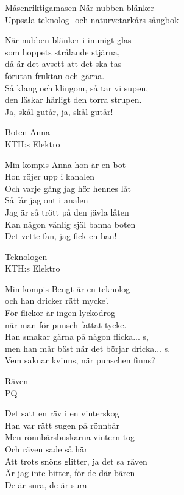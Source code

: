 \begin{song}{Måsen}{riktigamasen}
\newpage
  {\Large När nubben blänker}\\{\tiny  Uppsala teknolog- och naturvetarkårs sångbok}
  \begin{vers}
När nubben blänker i immigt glas \\
som hoppets strålande stjärna, \\
då är det avsett att det ska tas \\
förutan fruktan och gärna. \\
Så klang och klingom, så tar vi supen, \\
den läskar härligt den torra strupen. \\
Ja, skål gutår, ja, skål gutår! \\
\end{vers}
 

  {\Large Boten Anna}\\{\tiny  KTH:s Elektro}
  \begin{vers}
Min kompis Anna hon är en bot \\
Hon röjer upp i kanalen \\
Och varje gång jag hör hennes låt \\
Så får jag ont i analen\\ 
Jag är så trött på den jävla låten \\
Kan någon vänlig själ banna boten \\
Det vette fan, jag fick en ban! \\
\end{vers}


  {\Large Teknologen}\\{\tiny  KTH:s Elektro}
  \begin{vers}
Min kompis Bengt är en teknolog \\
och han dricker rätt mycke’. \\
För flickor är ingen lyckodrog \\
när man för punsch fattat tycke. \\
Han smakar gärna på någon flicka... s, \\
men han mår bäst när det börjar dricka... s. \\
Vem saknar kvinns, när punschen finns? \\
\end{vers}
 

  {\Large Räven}\\{\tiny  PQ}
  \begin{vers}
Det satt en räv i en vinterskog\\
Han var rätt sugen på rönnbär\\
Men rönnbärsbuskarna vintern tog\\
Och räven sade så här\\
Att trots snöns glitter, ja det sa räven \\
Är jag inte bitter, för de där bären\\
De är sura, de är sura\\
\end{vers}
 


\end{song}
